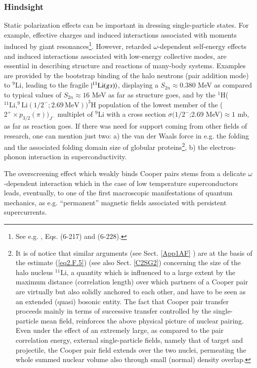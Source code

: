 \subsubsection{Hindsight}
Static polarization effects can be important in dressing single-particle states. For example, effective charges  and induced interactions associated with moments induced by giant resonances\footnote{See e.g. \cite{Bohr:75}, Eqs. (6-217) and (6-228).}. However, retarded $\omega$-dependent self-energy effects and induced interactions associated with low-energy collective modes, are essential in describing structure and reactions of many-body systems. Examples are provided by the bootstrap binding of the halo neutrons (pair addition mode) to $^9$Li, leading to the fragile $|{^{11}\text{Li}(gs)} \rangle$, displaying a $S_{2n}\approx0.380$ MeV as compared to typical values of $S_{2n}\approx16$ MeV as far as structure goes, and by the $^1$H($^{11}\text{Li},^9\text{Li}(1/2^-;2.69\,\text{MeV}))^3$H population of the lowest member of the ($2^+\times p_{3/2}(\pi))_{J^-}$ multiplet of $^9$Li with a cross section $\sigma(1/2^-$;2.69 MeV)$\approx 1$ mb, as far as reaction goes.
If there was need for support coming from other fields of research, one can mention just two: a) the van der Waals force in e.g. the folding and the associated folding domain size of globular proteins\footnote{It is of notice that similar arguments (see Sect. \ref{App1AF} ) are at the basis of the estimate (\ref{eq2.F.5}) (see also Sect. \ref{C2SG2}) concerning the size of the halo nucleus $^{11}$Li, a quantity which is influenced to a large extent by the maximum distance (correlation length)  over which  partners of a Cooper pair are virtually  but also solidly anchored to each other, and have to be seen as an extended (quasi) bosonic entity. The fact that Cooper pair transfer proceeds mainly in terms of successive transfer controlled by the single-particle mean field, reinforces the above physical picture of nuclear pairing. Even under the effect of an extremely large, as compared to the pair correlation energy, external single-particle fields, namely that of target and projectile, the Cooper pair field extends over the two nuclei, permeating the whole summed nuclear volume also through  small (normal) density overlap.}, b) the electron-phonon interaction in superconductivity.





The overscreening effect which  weakly binds Cooper pairs stems from a delicate $\omega$-dependent interaction which in the case of low temperature superconductors leads, eventually, to one of the first macroscopic manifestations of quantum mechanics, as e.g. ``permanent'' magnetic fields associated with persistent  supercurrents.

